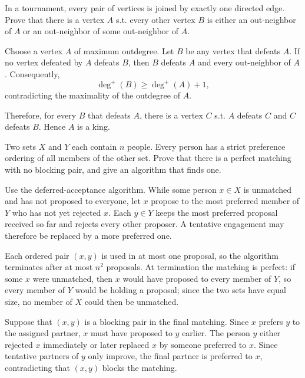     \begin{expectedproblem}
        In a tournament, every pair of vertices is joined by exactly one
        directed edge. Prove that there is a vertex $A$ s.t. every other
        vertex $B$ is either an out-neighbor of $A$ or an out-neighbor of some
        out-neighbor of $A$.
    \end{expectedproblem}

    \begin{solution}
        Choose a vertex $A$ of maximum outdegree. Let $B$ be any vertex that
        defeats $A$. If no vertex defeated by $A$ defeats $B$, then $B$ defeats
        $A$ and every out-neighbor of $A$. Consequently,
        \[
            \deg^+(B)\geq\deg^+(A)+1,
        \]
        contradicting the maximality of the outdegree of $A$.

        Therefore, for every $B$ that defeats $A$, there is a vertex $C$ s.t. $A$ defeats $C$ and $C$ defeats $B$. Hence $A$ is a king.
    \end{solution}

    \begin{expectedproblem}
        Two sets $X$ and $Y$ each contain $n$ people. Every person has a strict
        preference ordering of all members of the other set. Prove that there
        is a perfect matching with no blocking pair, and give an algorithm that
        finds one.
    \end{expectedproblem}

    \begin{solution}
        Use the deferred-acceptance algorithm. While some person $x\in X$ is
        unmatched and has not proposed to everyone, let $x$ propose to the most
        preferred member of $Y$ who has not yet rejected $x$. Each $y\in Y$
        keeps the most preferred proposal received so far and rejects every
        other proposer. A tentative engagement may therefore be replaced by a
        more preferred one.

        Each ordered pair $(x,y)$ is used in at most one proposal, so the
        algorithm terminates after at most $n^2$ proposals. At termination the
        matching is perfect: if some $x$ were unmatched, then $x$ would have
        proposed to every member of $Y$, so every member of $Y$ would be
        holding a proposal; since the two sets have equal size, no member of
        $X$ could then be unmatched.

        Suppose that $(x,y)$ is a blocking pair in the final matching. Since
        $x$ prefers $y$ to the assigned partner, $x$ must have proposed to $y$
        earlier. The person $y$ either rejected $x$ immediately or later
        replaced $x$ by someone preferred to $x$. Since tentative partners of
        $y$ only improve, the final partner is preferred to $x$, contradicting
        that $(x,y)$ blocks the matching.
    \end{solution}

